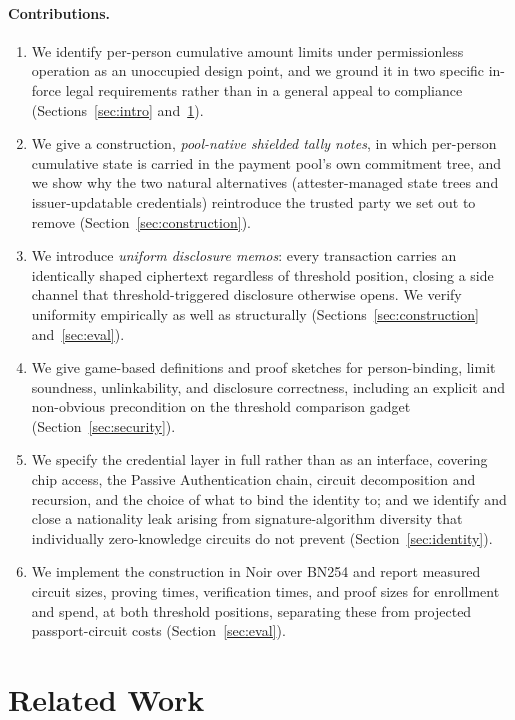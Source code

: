 \documentclass[11pt,a4paper]{article}
\theoremstyle{definition}
\theoremstyle{plain}
\theoremstyle{remark}
\begin{document}
\paragraph{Contributions.}
\begin{enumerate}
\item We identify per-person cumulative amount limits under permissionless operation as an unoccupied design point, and we ground it in two specific in-force legal requirements rather than in a general appeal to compliance (Sections~\ref{sec:intro} and~\ref{sec:related}).
\item We give a construction, \emph{pool-native shielded tally notes}, in which per-person cumulative state is carried in the payment pool's own commitment tree, and we show why the two natural alternatives (attester-managed state trees and issuer-updatable credentials) reintroduce the trusted party we set out to remove (Section~\ref{sec:construction}).
\item We introduce \emph{uniform disclosure memos}: every transaction carries an identically shaped ciphertext regardless of threshold position, closing a side channel that threshold-triggered disclosure otherwise opens. We verify uniformity empirically as well as structurally (Sections~\ref{sec:construction} and~\ref{sec:eval}).
\item We give game-based definitions and proof sketches for person-binding, limit soundness, unlinkability, and disclosure correctness, including an explicit and non-obvious precondition on the threshold comparison gadget (Section~\ref{sec:security}).
\item We specify the credential layer in full rather than as an interface, covering chip access, the Passive Authentication chain, circuit decomposition and recursion, and the choice of what to bind the identity to; and we identify and close a nationality leak arising from signature-algorithm diversity that individually zero-knowledge circuits do not prevent (Section~\ref{sec:identity}).
\item We implement the construction in Noir over BN254 and report measured circuit sizes, proving times, verification times, and proof sizes for enrollment and spend, at both threshold positions, separating these from projected passport-circuit costs (Section~\ref{sec:eval}).
\end{enumerate}

\section{Related Work}
\label{sec:related}
\end{document}
